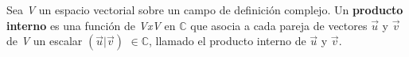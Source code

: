 \documentclass[preview]{standalone}
\begin{document}
\begin{center}
Sea \textit{V} un espacio vectorial sobre un campo de definición complejo. Un \textbf{producto interno} es una función de \textit{VxV} en $\mathbb{C}$ que asocia a cada pareja de vectores $\vec{u}$ y $\vec{v}$ de \textit{V} un escalar $(\vec{u} | \vec{v})$ $\in \mathbb{C}$, llamado el producto interno de  $\vec{u}$ y $\vec{v}$.
\end{center}
\end{document}
